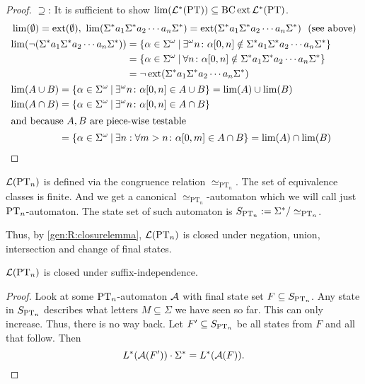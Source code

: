\begin{theorem}
\begin{proof}
$\supseteq$: It is sufficient to show $\lim(\mathcal{L}^* (\textup{\textrm{PT}})) \subseteq \operatorname{BC} \operatorname{ext} \mathcal{L}^* (\textup{\textrm{PT}})$.
\begin{align*}
& \lim(\emptyset) = \ext(\emptyset), \ \lim(\Sigma^* a_1 \Sigma^* a_2 \dotsb a_n \Sigma^*) = \ext(\Sigma^* a_1 \Sigma^* a_2 \dotsb a_n \Sigma^*) \ \ \text{(see above)} \\
& \begin{aligned}
\lim( \neg ( \Sigma^* a_1 \Sigma^* a_2 \dotsb a_n \Sigma^* ) ) & = \Set{ \alpha \in \Sigma^\omega }{ \exists^\omega n \colon \alpha [0,n] \notin \Sigma^* a_1 \Sigma^* a_2 \dotsb a_n \Sigma^* } \\
& = \Set{ \alpha \in \Sigma^\omega }{ \forall n \colon \alpha [0,n] \notin \Sigma^* a_1 \Sigma^* a_2 \dotsb a_n \Sigma^* } \\
& = \neg \ext( \Sigma^* a_1 \Sigma^* a_2 \dotsb a_n \Sigma^* )
\end{aligned} \\
& \begin{aligned}
\lim(A \cup B) & = \Set{ \alpha \in \Sigma^\omega }{ \exists^\omega n \colon \alpha[0,n] \in A \cup B } = \lim(A) \cup \lim(B) \\
\lim(A \cap B) & = \Set{ \alpha \in \Sigma^\omega }{ \exists^\omega n \colon \alpha[0,n] \in A \cap B } \\
\intertext{and because $A,B$ are piece-wise testable}
& = \Set{ \alpha \in \Sigma^\omega }{ \exists n : \forall m > n \colon \alpha[0,m] \in A \cap B } = \lim(A) \cap \lim(B)
\end{aligned}
\end{align*}
\end{proof}
\end{theorem}

$\mathcal{L}(\textup{\textrm{PT}}_n)$ is defined via the congruence relation $\simeq_{\text{PT}_n}$. The set of equivalence classes is finite. And we get a canonical $\simeq_{\text{PT}_n}$-automaton which we will call just $\textup{\textrm{PT}}_n$-automaton. The state set of such automaton is $S_{\textup{\textrm{PT}}_n} := \Sigma^* / \simeq_{\text{PT}_n}$.

Thus, by \cref{gen:R:closurelemma}, $\mathcal{L}(\textup{\textrm{PT}}_n)$ is closed under negation, union, intersection and change of final states.

\begin{lemma}
$\mathcal{L}(\textup{\textrm{PT}}_n)$ is closed under suffix-independence.
\begin{proof}
Look at some $\textup{\textrm{PT}}_n$-automaton $\mathcal{A}$ with final state set $F \subseteq S_{\textup{\textrm{PT}}_n}$. Any state in $S_{\textup{\textrm{PT}}_n}$ describes what letters $M \subseteq \Sigma$ we have seen so far. This can only increase. Thus, there is no way back. Let $F' \subseteq S_{\textup{\textrm{PT}}_n}$ be all states from $F$ and all that follow. Then
\[ L^*(\mathcal{A}(F')) \cdot \Sigma^* = L^*(\mathcal{A}(F)) . \]
\end{proof}
\end{lemma}

